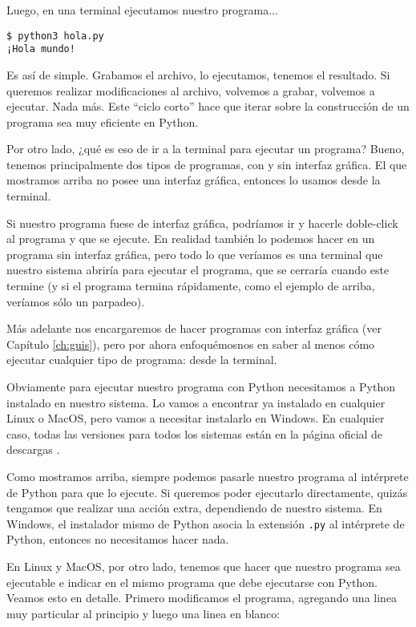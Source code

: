 Luego, en una terminal ejecutamos nuestro programa...

\begin{verbatim}
$ python3 hola.py
¡Hola mundo!
\end{verbatim}

Es así de simple. Grabamos el archivo, lo ejecutamos, tenemos el resultado. Si queremos realizar modificaciones al archivo, volvemos a grabar, volvemos a ejecutar. Nada más. Este ``ciclo corto'' hace que iterar sobre la construcción de un programa sea muy eficiente en Python.

Por otro lado, ¿qué es eso de ir a la terminal para ejecutar un programa? Bueno, tenemos principalmente dos tipos de programas, con y sin interfaz gráfica. El que mostramos arriba no posee una interfaz gráfica, entonces lo usamos desde la terminal. 

Si nuestro programa fuese de interfaz gráfica, podríamos ir y hacerle doble-click al programa y que se ejecute. En realidad también lo podemos hacer en un programa sin interfaz gráfica, pero todo lo que veríamos es una terminal que nuestro sistema abriría para ejecutar el programa, que se cerraría cuando este termine (y si el programa termina rápidamente, como el ejemplo de arriba, veríamos sólo un parpadeo).

Más adelante nos encargaremos de hacer programas con interfaz gráfica (ver Capítulo \ref{ch:guis}), pero por ahora enfoquémosnos en saber al menos cómo ejecutar cualquier tipo de programa: desde la terminal.

Obviamente para ejecutar nuestro programa con Python necesitamos a Python instalado en nuestro sistema. Lo vamos a encontrar ya instalado en cualquier Linux o MacOS, pero vamos a necesitar instalarlo en Windows. En cualquier caso, todas las versiones para todos los sistemas están en la página oficial de descargas \cite{pydownloads}. 

Como mostramos arriba, siempre podemos pasarle nuestro programa al intérprete de Python para que lo ejecute. Si queremos poder ejecutarlo directamente, quizás tengamos que realizar una acción extra, dependiendo de nuestro sistema. En Windows, el instalador mismo de Python asocia la extensión \texttt{.py} al intérprete de Python, entonces no necesitamos hacer nada. 

En Linux y MacOS, por otro lado, tenemos que hacer que nuestro programa sea ejecutable e indicar en el mismo programa que debe ejecutarse con Python. Veamos esto en detalle. Primero modificamos el programa, agregando una linea muy particular al principio y luego una linea en blanco:

